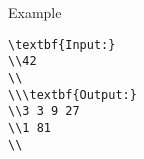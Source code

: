 Example
\begin{verbatim}
\textbf{Input:}
\\42
\\
\\\textbf{Output:}
\\3 3 9 27
\\1 81
\\\end{verbatim}